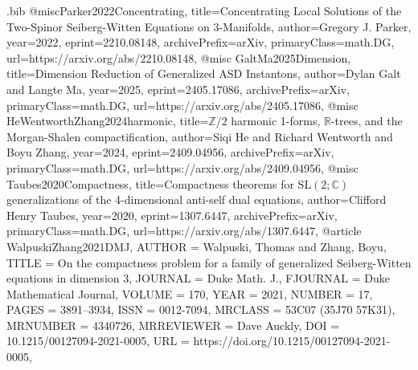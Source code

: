 \begin{filecontents}[overwrite]{\jobname.bib}
@misc{Parker2022Concentrating,
      title={Concentrating Local Solutions of the Two-Spinor Seiberg-Witten Equations on 3-Manifolds}, 
      author={Gregory J. Parker},
      year={2022},
      eprint={2210.08148},
      archivePrefix={arXiv},
      primaryClass={math.DG},
      url={https://arxiv.org/abs/2210.08148}, 
}
@misc {GaltMa2025Dimension,
  title={Dimension Reduction of Generalized {ASD} Instantons},
      author={Dylan Galt and Langte Ma},
      year={2025},
      eprint={2405.17086},
      archivePrefix={arXiv},
      primaryClass={math.DG},
      url={https://arxiv.org/abs/2405.17086},
}
@misc {HeWentworthZhang2024harmonic,
  title={$\mathbb{Z}/2$ harmonic 1-forms, $\mathbb{R}$-trees, and the Morgan-Shalen compactification},
      author={Siqi He and Richard Wentworth and Boyu Zhang},
      year={2024},
      eprint={2409.04956},
      archivePrefix={arXiv},
      primaryClass={math.DG},
      url={https://arxiv.org/abs/2409.04956},
}
@misc {Taubes2020Compactness,
      title={Compactness theorems for $\mathrm{SL}(2;\mathbb{C})$ generalizations of the 4-dimensional anti-self dual equations},
      author={Clifford Henry Taubes},
      year={2020},
      eprint={1307.6447},
      archivePrefix={arXiv},
      primaryClass={math.DG},
      url={https://arxiv.org/abs/1307.6447},
}
@article {WalpuskiZhang2021DMJ,
    AUTHOR = {Walpuski, Thomas and Zhang, Boyu},
     TITLE = {On the compactness problem for a family of generalized
              {S}eiberg-{W}itten equations in dimension 3},
   JOURNAL = {Duke Math. J.},
  FJOURNAL = {Duke Mathematical Journal},
    VOLUME = {170},
      YEAR = {2021},
    NUMBER = {17},
     PAGES = {3891--3934},
      ISSN = {0012-7094},
   MRCLASS = {53C07 (35J70 57K31)},
  MRNUMBER = {4340726},
MRREVIEWER = {Dave Auckly},
       DOI = {10.1215/00127094-2021-0005},
       URL = {https://doi.org/10.1215/00127094-2021-0005},
}
\end{filecontents}
\documentclass[a4paper]{amsart}
\usepackage[backref=page]{hyperref}
\usepackage[abbrev,msc-links,backrefs]{amsrefs} %






\cites{Parker2022Concentrating,GaltMa2025Dimension,HeWentworthZhang2024harmonic,Taubes2020Compactness,WalpuskiZhang2021DMJ}



  